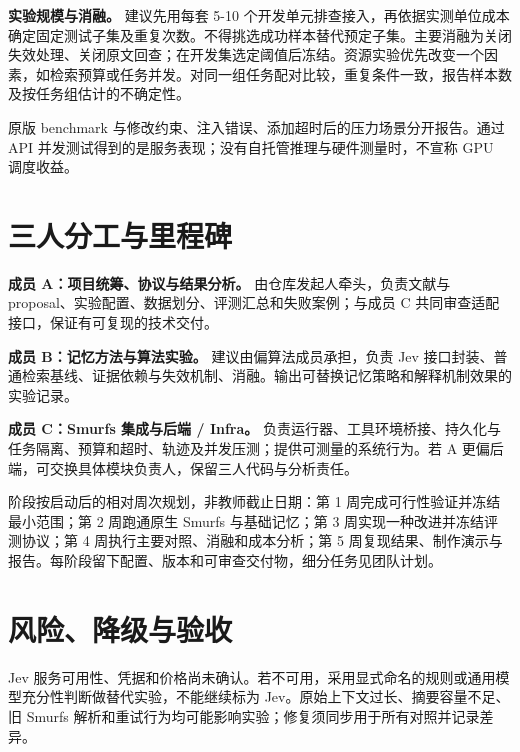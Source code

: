 \documentclass[UTF8,a4paper,zihao=5]{ctexart}
\begin{document}
\textbf{实验规模与消融。} 建议先用每套 5-10 个开发单元排查接入，再依据实测单位成本确定固定测试子集及重复次数。不得挑选成功样本替代预定子集。主要消融为关闭失效处理、关闭原文回查；在开发集选定阈值后冻结。资源实验优先改变一个因素，如检索预算或任务并发。对同一组任务配对比较，重复条件一致，报告样本数及按任务组估计的不确定性。

原版 benchmark 与修改约束、注入错误、添加超时后的压力场景分开报告。通过 API 并发测试得到的是服务表现；没有自托管推理与硬件测量时，不宣称 GPU 调度收益。

\section{三人分工与里程碑}
\begin{samepage}\textbf{成员 A：项目统筹、协议与结果分析。} 由仓库发起人牵头，负责文献与 proposal、实验配置、数据划分、评测汇总和失败案例；与成员 C 共同审查适配接口，保证有可复现的技术交付。\par\end{samepage}

\begin{samepage}\textbf{成员 B：记忆方法与算法实验。} 建议由偏算法成员承担，负责 Jev 接口封装、普通检索基线、证据依赖与失效机制、消融。输出可替换记忆策略和解释机制效果的实验记录。\par\end{samepage}

\begin{samepage}\textbf{成员 C：Smurfs 集成与后端 / Infra。} 负责运行器、工具环境桥接、持久化与任务隔离、预算和超时、轨迹及并发压测；提供可测量的系统行为。若 A 更偏后端，可交换具体模块负责人，保留三人代码与分析责任。\par\end{samepage}

阶段按启动后的相对周次规划，非教师截止日期：第 1 周完成可行性验证并冻结最小范围；第 2 周跑通原生 Smurfs 与基础记忆；第 3 周实现一种改进并冻结评测协议；第 4 周执行主要对照、消融和成本分析；第 5 周复现结果、制作演示与报告。每阶段留下配置、版本和可审查交付物，细分任务见团队计划。

\section{风险、降级与验收}
Jev 服务可用性、凭据和价格尚未确认。若不可用，采用显式命名的规则或通用模型充分性判断做替代实验，不能继续标为 Jev。原始上下文过长、摘要容量不足、旧 Smurfs 解析和重试行为均可能影响实验；修复须同步用于所有对照并记录差异。
\end{document}
